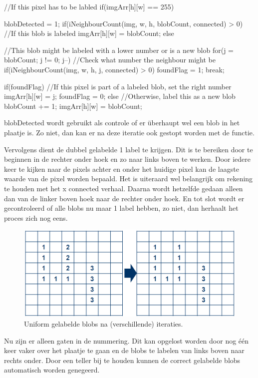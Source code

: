\begin{cppcode}
//If this pixel has to be labled
if(imgArr[h][w] == 255){
  blobDetected = 1;
  if(iNeighbourCount(img, w, h, blobCount, connected) > 0){ //If this blob is labeled
      imgArr[h][w] = blobCount;
  } else { //This blob might be labeled with a lower number or is a new blob
      for(j = blobCount; j != 0; j--){ //Check what number the neighbour might be
          if(iNeighbourCount(img, w, h, j, connected) > 0){
              foundFlag = 1;
              break;
          }
      }

      if(foundFlag){ //If this pixel is part of a labeled blob, set the right number
          imgArr[h][w] = j;
          foundFlag = 0;
      } else { //Otherwise, label this as a new blob
          blobCount += 1;
          imgArr[h][w] = blobCount;
      }

  }
}
\end{cppcode}
blobDetected wordt gebruikt als controle of er überhaupt wel een blob in het
plaatje is. Zo niet, dan kan er na deze iteratie ook gestopt worden met de
functie.

Vervolgens dient de dubbel gelabelde 1 label te krijgen. Dit is te bereiken
door te beginnen in de rechter onder hoek en zo naar links boven te werken.
Door iedere keer te kijken naar de pixels achter en onder het huidige pixel
kan de laagste waarde van de pixel worden bepaald. Het is uiteraard wel
belangrijk om rekening te houden met het x connected verhaal.
Daarna wordt hetzelfde gedaan alleen dan van de linker boven hoek naar de
rechter onder hoek. En tot slot wordt er gecontroleerd of alle blobs nu
maar 1 label hebben, zo niet, dan herhaalt het proces zich nog eens.

\begin{figure}
    \begin{center}
        \includegraphics[scale=0.4]{figures/label_blobs_step2.png}
    \end{center}
    \caption{Uniform gelabelde blobs na (verschillende) iteraties.}
    \label{fig:lbstep2}
\end{figure}

Nu zijn er alleen gaten in de nummering. Dit kan opgelost worden door nog
één keer vaker over het plaatje te gaan en de blobs te labelen van links
boven naar rechts onder. Door een teller bij te houden kunnen de correct
gelabelde blobs automatisch worden genegeerd.

